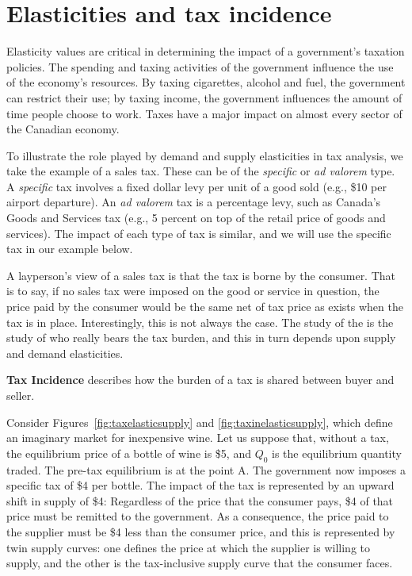 \section{Elasticities and tax incidence}\label{sec:ch4sec7}

Elasticity values are critical in determining the impact of a government's taxation policies. The spending and taxing activities of the government influence the use of the economy's resources. By taxing cigarettes, alcohol and fuel, the government can restrict their use; by taxing income, the government influences the amount of time people choose to work. Taxes have a major impact on almost every sector of the Canadian economy. 

To illustrate the role played by demand and supply elasticities in tax analysis, we take the example of a sales tax. These can be of the \textit{specific} or \textit{ad valorem} type. A \textit{specific} tax involves a fixed dollar levy per unit of a good sold (e.g., \$10 per airport departure). An \textit{ad valorem} tax is a percentage levy, such as Canada's Goods and Services tax (e.g., 5 percent on top of the retail price of goods and services). The impact of each type of tax is similar, and we will use the specific tax in our example below. 

A layperson's view of a sales tax is that the tax is borne by the consumer. That is to say, if no sales tax were imposed on the good or service in question, the price paid by the consumer would be the same net of tax price as exists when the tax is in place. Interestingly, this is not always the case. The study of the  is the study of who really bears the tax burden, and this in turn depends upon supply and demand elasticities. 

\begin{DefBox}
\textbf{Tax Incidence} describes how the burden of a tax is shared between buyer and seller.
\end{DefBox}

Consider Figures~\ref{fig:taxelasticsupply} and \ref{fig:taxinelasticsupply}, which define an imaginary market for inexpensive wine. Let us suppose that, without a tax, the equilibrium price of a bottle of wine is \$5, and $Q_0$ is the equilibrium quantity traded. The pre-tax equilibrium is at the point A. The government now imposes a specific tax of \$4 per bottle. The impact of the tax is represented by an upward shift in supply of \$4: Regardless of the price that the consumer pays, \$4 of that price must be remitted to the government. As a consequence, the price paid to the supplier must be \$4 less than the consumer price, and this is represented by twin supply curves: one defines the price at which the supplier is willing to supply, and the other is the tax-inclusive supply curve that the consumer faces.

